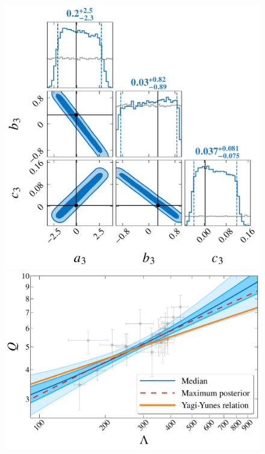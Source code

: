 \documentclass[a4paper,11pt]{article}
\begin{document}
\begin{figure}[t]
    \begin{minipage}[t]{0.49\textwidth}
    \centering
        \includegraphics[width=0.8\linewidth]{fig_hyper_parameter_3d.pdf}
    \end{minipage}
    \hfill
    \begin{minipage}[t]{0.49\textwidth}
        \includegraphics[width=\linewidth]{fig_hierarchical_results_3d.pdf}
    \end{minipage}

    \vspace{3mm}


\end{figure}
\end{document}
